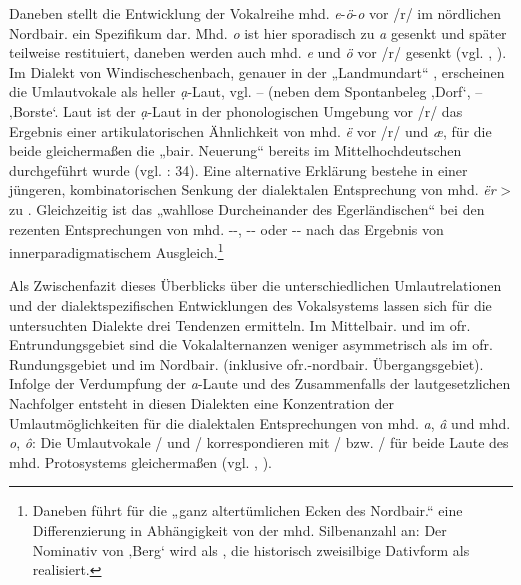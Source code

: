 Daneben stellt die Entwicklung der Vokalreihe mhd. {\textit{e}}{{}-}{\textit{ö}}{{}-}{\textit{o}} vor /r/ im nördlichen Nordbair. ein Spezifikum dar. Mhd. \textit{o} ist hier sporadisch zu \textit{a} gesenkt und später teilweise restituiert, daneben werden auch mhd. \textit{e} und \textit{ö} vor /r/ gesenkt (vgl. \citealt[§5g und Karte 8]{Kranzmayer1956}, \citealt[63]{Rowley1997}). Im Dialekt von Windischeschenbach, genauer in der „Landmundart“ \citep[33]{Denz1977}, erscheinen die Umlautvokale als heller \textit{ạ}{}-Laut, vgl.  --  (neben dem Spontanbeleg  ‚Dorf‘,  --  ‚Borste‘. Laut \citet[56--57]{Steger1968} ist der \textit{ạ}{}-Laut in der phonologischen Umgebung vor /r/ das Ergebnis einer artikulatorischen Ähnlichkeit von mhd. \textit{ë} vor /r/ und \textit{æ}, für die beide gleichermaßen die „bair. Neuerung“ bereits im Mittelhochdeutschen durchgeführt wurde (vgl. \citealt{Denz1977}: 34). Eine alternative Erklärung bestehe in einer jüngeren, kombinatorischen Senkung der dialektalen Entsprechung von mhd. \textit{ër} > \textit{} zu \textit{} \citep[57]{Steger1968}. Gleichzeitig ist das „wahllose Durcheinander des Egerländischen“ bei den rezenten Entsprechungen von mhd. -\textit{}-, -\textit{}- oder -\textit{}- nach \citet[§3k1]{Kranzmayer1956} das Ergebnis von innerparadigmatischem Ausgleich.\footnote{Daneben führt \citet[§3k1]{Kranzmayer1956} für die „ganz altertümlichen Ecken des Nordbair.“ eine Differenzierung in Abhängigkeit von der mhd. Silbenanzahl an: Der Nominativ von ‚Berg‘ wird als , die historisch zweisilbige Dativform als  realisiert.}

Als Zwischenfazit dieses Überblicks über die unterschiedlichen Umlautrelationen und der dialektspezifischen Entwicklungen des Vokalsystems lassen sich für die untersuchten Dialekte drei Tendenzen ermitteln. Im Mittelbair. und im ofr. Entrundungsgebiet sind die Vokalalternanzen weniger asymmetrisch als im ofr. Rundungsgebiet und im Nordbair. (inklusive ofr.-nordbair. Übergangsgebiet). Infolge der Verdumpfung der \textit{a}{}-Laute und des Zusammenfalls der lautgesetzlichen Nachfolger entsteht in diesen Dialekten eine Konzentration der Umlautmöglichkeiten für die dialektalen Entsprechungen von mhd. \textit{a}, \textit{â} und mhd. \textit{o}, \textit{ô}: Die Umlautvokale / und / korrespondieren mit / bzw. / für beide Laute des mhd. Protosystems gleichermaßen (vgl. , \citealt[Karte 9]{Rowley1997}).

